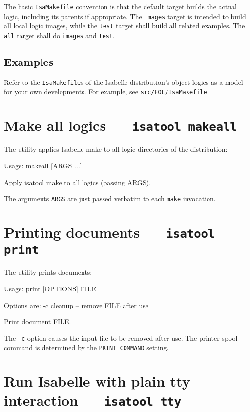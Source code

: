 \medskip The basic \texttt{IsaMakefile} convention is that the default
target builds the actual logic, including its parents if appropriate.
The \texttt{images} target is intended to build all local logic
images, while the \texttt{test} target shall build all related
examples.  The \texttt{all} target shall do \texttt{images} and
\texttt{test}.


\subsection*{Examples}

Refer to the \texttt{IsaMakefile}s of the Isabelle distribution's
object-logics as a model for your own developments.  For example, see
\texttt{src/FOL/IsaMakefile}.


\section{Make all logics --- \texttt{isatool makeall}}

The  utility applies Isabelle make to all logic
directories of the distribution:
\begin{ttbox}
Usage: makeall [ARGS ...]

  Apply isatool make to all logics (passing ARGS).
\end{ttbox}
The arguments \texttt{ARGS} are just passed verbatim to each
\texttt{make} invocation.


\section{Printing documents --- \texttt{isatool print}}

The  utility prints documents:
\begin{ttbox}
Usage: print [OPTIONS] FILE

  Options are:
    -c           cleanup -- remove FILE after use

  Print document FILE.
\end{ttbox}

The \texttt{-c} option causes the input file to be removed after use.  The
printer spool command is determined by the \texttt{PRINT_COMMAND} setting.


\section{Run Isabelle with plain tty interaction --- \texttt{isatool tty}} \label{sec:tool-tty}

